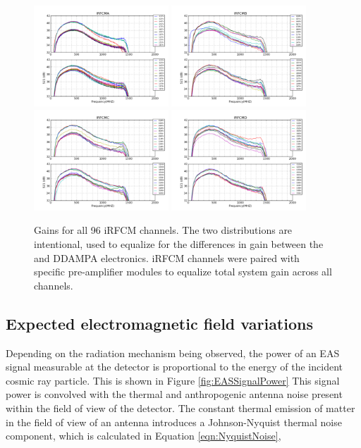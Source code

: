 \begin{figure}
\centering
	\includegraphics[width=0.45\textwidth]{figures/IRFCMA}
	\includegraphics[width=0.45\textwidth]{figures/IRFCMB}	
	\includegraphics[width=0.45\textwidth]{figures/IRFCMC}
	\includegraphics[width=0.45\textwidth]{figures/IRFCMD}	
	\caption{Gains for all 96 iRFCM channels.  The two distributions are intentional, used to equalize for the differences in gain between the  and DDAMPA electronics. iRFCM channels were paired with specific pre-amplifier modules to equalize total system gain across all channels.}
	\label{fig:IRFCMgain}
\end{figure}		

	\subsection{Expected electromagnetic field variations}
		Depending on the radiation mechanism being observed, the power of an EAS signal measurable at the detector is proportional to the energy of the incident cosmic ray particle\cite{EnergyEstimator}.  This is shown in Figure \ref{fig:EASSignalPower} This signal power is convolved with the thermal and anthropogenic antenna noise present within the field of view of the detector.  The constant thermal emission of matter in the field of view of an antenna introduces a Johnson-Nyquist thermal noise component, which is calculated in Equation \ref{eqn:NyquistNoise},

